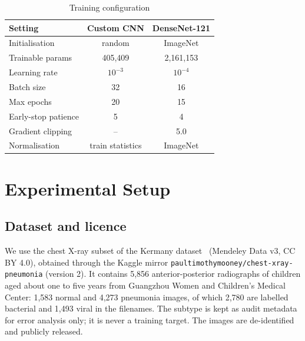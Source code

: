\documentclass[conference]{IEEEtran}
\begin{document}
\begin{table}[t]
\caption{Training configuration}
\label{tab:hparams}
\centering
\begin{tabular}{@{}lcc@{}}
\toprule
Setting & Custom CNN & DenseNet-121 \\
\midrule
Initialisation & random & ImageNet \\
Trainable params & 405,409 & 2,161,153 \\
Learning rate & $10^{-3}$ & $10^{-4}$ \\
Batch size & 32 & 16 \\
Max epochs & 20 & 15 \\
Early-stop patience & 5 & 4 \\
Gradient clipping & -- & 5.0 \\
Normalisation & train statistics & ImageNet \\
\bottomrule
\end{tabular}
\end{table}

\section{Experimental Setup}
\label{sec:setup}

\subsection{Dataset and licence}
We use the chest X-ray subset of the Kermany dataset~\cite{kermany-data} (Mendeley Data v3, CC BY 4.0), obtained through the Kaggle mirror \texttt{paultimothymooney/chest-xray-pneumonia} (version 2). It contains 5,856 anterior-posterior radiographs of children aged about one to five years from Guangzhou Women and Children's Medical Center: 1,583 normal and 4,273 pneumonia images, of which 2,780 are labelled bacterial and 1,493 viral in the filenames. The subtype is kept as audit metadata for error analysis only; it is never a training target. The images are de-identified and publicly released.
\end{document}
